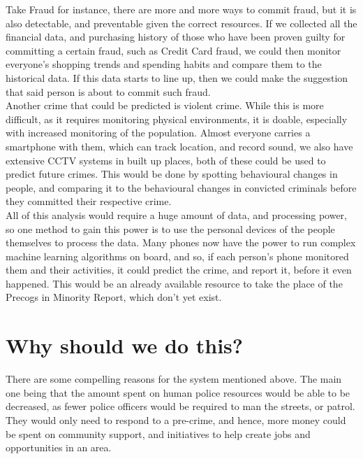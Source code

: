 \documentclass[12pt]{amsart}
\begin{document}
    Take Fraud for instance, there are more and more ways to commit fraud, but it is also detectable, and preventable
    given the correct resources.
    If we collected all the financial data, and purchasing history of those who have been proven guilty for
    committing a certain fraud, such as Credit Card fraud, we could then monitor everyone's shopping trends and spending
    habits and compare them to the historical data.
    If this data starts to line up, then we could make the suggestion that said person is about to commit such fraud.
    \\

    Another crime that could be predicted is violent crime.
    While this is more difficult, as it requires monitoring physical environments, it is doable, especially with
    increased monitoring of the population.
    Almost everyone carries a smartphone with them, which can track location, and record sound, we also have extensive
    CCTV systems in built up places, both of these could be used to predict future crimes.
    This would be done by spotting behavioural changes in people, and comparing it to the behavioural changes in
    convicted criminals before they committed their respective crime.
    \\

    All of this analysis would require a huge amount of data, and processing power, so one method to gain this power
    is to use the personal devices of the people themselves to process the data.
    Many phones now have the power to run complex machine learning algorithms on board, and so, if each person's phone
    monitored them and their activities, it could predict the crime, and report it, before it even happened.
    This would be an already available resource to take the place of the Precogs in Minority Report, which don't yet
    exist.

    \section{Why should we do this?}\label{sec:why-should-we-do-this?}

    There are some compelling reasons for the system mentioned above.
    The main one being that the amount spent on human police resources would be able to be decreased, as fewer
    police officers would be required to man the streets, or patrol.
    They would only need to respond to a pre-crime, and hence, more money could be spent on community support, and
    initiatives to help create jobs and opportunities in an area.
    \\
\end{document}

